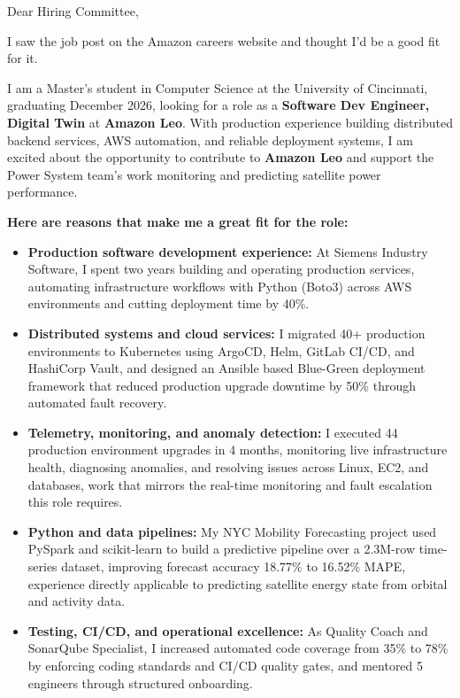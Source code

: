 \documentclass[11pt]{letter}
\date{}
\begin{document}
\begin{letter}{}

\opening{Dear Hiring Committee,}

I saw the job post on the Amazon careers website and thought I'd be a good fit for it.

I am a Master's student in Computer Science at the University of Cincinnati, graduating December 2026, looking for a role as a \textbf{Software Dev Engineer, Digital Twin} at \textbf{Amazon Leo}. With production experience building distributed backend services, AWS automation, and reliable deployment systems, I am excited about the opportunity to contribute to \textbf{Amazon Leo} and support the Power System team's work monitoring and predicting satellite power performance.

\textbf{Here are reasons that make me a great fit for the role:}

\begin{itemize}[leftmargin=*, itemsep=0.45em]
    \item \textbf{Production software development experience:} At Siemens Industry Software, I spent two years building and operating production services, automating infrastructure workflows with Python (Boto3) across AWS environments and cutting deployment time by 40\%.

    \item \textbf{Distributed systems and cloud services:} I migrated 40+ production environments to Kubernetes using ArgoCD, Helm, GitLab CI/CD, and HashiCorp Vault, and designed an Ansible based Blue-Green deployment framework that reduced production upgrade downtime by 50\% through automated fault recovery.

    \item \textbf{Telemetry, monitoring, and anomaly detection:} I executed 44 production environment upgrades in 4 months, monitoring live infrastructure health, diagnosing anomalies, and resolving issues across Linux, EC2, and databases, work that mirrors the real-time monitoring and fault escalation this role requires.

    \item \textbf{Python and data pipelines:} My NYC Mobility Forecasting project used PySpark and scikit-learn to build a predictive pipeline over a 2.3M-row time-series dataset, improving forecast accuracy 18.77\% to 16.52\% MAPE, experience directly applicable to predicting satellite energy state from orbital and activity data.

    \item \textbf{Testing, CI/CD, and operational excellence:} As Quality Coach and SonarQube Specialist, I increased automated code coverage from 35\% to 78\% by enforcing coding standards and CI/CD quality gates, and mentored 5 engineers through structured onboarding.
\end{itemize}


\end{letter}
\end{document}
